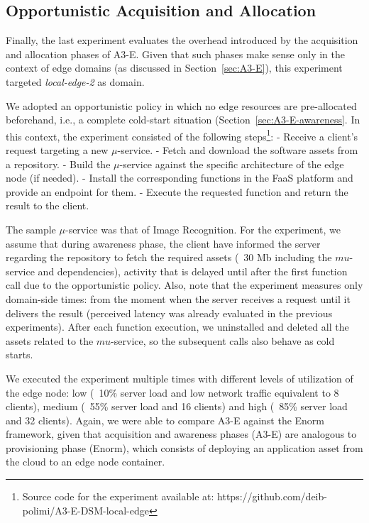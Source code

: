 


\subsection{Opportunistic Acquisition and Allocation}

Finally, the last experiment evaluates the overhead introduced by the acquisition and allocation phases of A3-E. Given that such phases make sense only in the context of edge domains (as discussed in Section~\ref{sec:A3-E}), this experiment targeted \textit{local-edge-2} as domain. 

We adopted an opportunistic policy in which no edge resources are pre-allocated beforehand, i.e., a complete cold-start situation (Section~\ref{sec:A3-E-awareness}. In this context, the experiment consisted of the following steps\footnote{Source code for the experiment available at: https://github.com/deib-polimi/A3-E-DSM-local-edge}:
- Receive a client's request targeting a new $\mu$-service.
- Fetch and download the software assets from a repository.
- Build the $\mu$-service against the specific architecture of the edge node (if needed).
- Install the corresponding functions in the FaaS platform and provide an endpoint for them. 
- Execute the requested function and return the result to the client.

The sample $\mu$-service was that of Image Recognition. For the experiment, we assume that during awareness phase, the client have informed the server regarding the repository to fetch the required assets (~30 Mb including the $mu$-service and dependencies), activity that is delayed until after the first function call due to the opportunistic policy. Also, note that the experiment measures only domain-side times: from the moment when the server receives a request until it delivers the result (perceived latency was already evaluated in the previous experiments). After each function execution, we uninstalled and deleted all the assets related to the $mu$-service, so the subsequent calls also behave as cold starts.

We executed the experiment multiple times with different levels of utilization of the edge node: low (~10\% server load and low network traffic equivalent to 8 clients), medium (~55\% server load and 16 clients) and high (~85\% server load and 32 clients). Again, we were able to compare A3-E against the Enorm framework, given that acquisition and awareness phases (A3-E) are analogous to provisioning phase (Enorm), which consists of deploying an application asset from the cloud to an edge node container. 

